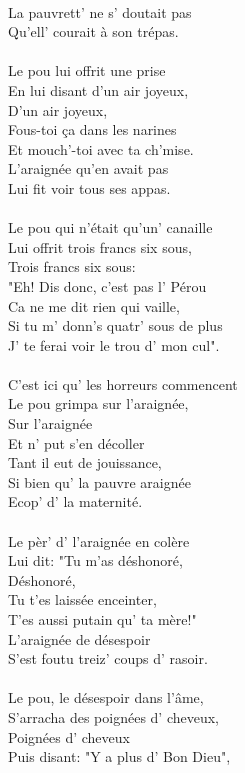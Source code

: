 \\La pauvrett' ne s' doutait pas
\\Qu'ell' courait à son trépas.
\\\\Le pou lui offrit une prise
\\En lui disant d'un air joyeux,
\\D'un air joyeux,
\\Fous-toi ça dans les narines
\\Et mouch'-toi avec ta ch'mise.
\\L'araignée qu'en avait pas
\\Lui fit voir tous ses appas.
\\\\Le pou qui n'était qu'un' canaille
\\Lui offrit trois francs six sous,
\\Trois francs six sous:
\\"Eh! Dis donc, c'est pas l' Pérou
\\Ca ne me dit rien qui vaille,
\\Si tu m' donn's quatr' sous de plus
\\J' te ferai voir le trou d' mon cul".
\\\\C'est ici qu' les horreurs commencent
\\Le pou grimpa sur l'araignée,
\\Sur l'araignée
\\Et n' put s'en décoller
\\Tant il eut de jouissance,
\\Si bien qu' la pauvre araignée
\\Ecop' d' la maternité.
\\\\Le pèr' d' l'araignée en colère
\\Lui dit: "Tu m'as déshonoré,
\\Déshonoré,
\\Tu t'es laissée enceinter,
\\T'es aussi putain qu' ta mère!"
\\L'araignée de désespoir
\\S'est foutu treiz' coups d' rasoir.
\\\\Le pou, le désespoir dans l'âme,
\\S'arracha des poignées d' cheveux,
\\Poignées d' cheveux
\\Puis disant: "Y a plus d' Bon Dieu",
